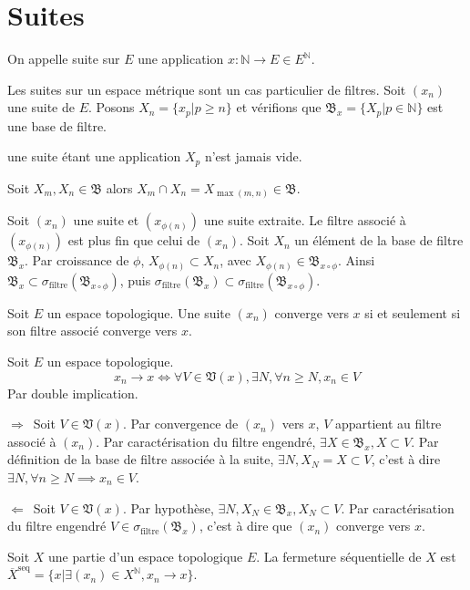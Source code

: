 \documentclass[a4paper, 11pt, french]{book}
\newenvironment{itemise}{\itemize}{\enditemize}
\theoremstyle{plain} %
\theoremstyle{definition} %
\theoremstyle{remark} %
\newcommand\impldir{$\boxed{\Rightarrow}$\ }
\newcommand\implrec{$\boxed{\Leftarrow}$\ }
\newcommand{\1}{\mathds{1}}
\newcommand{\supegal}{\geqslant}
\newcommand{\N}{\mathbb{N}}
\begin{document}
\section{Suites}

On appelle suite sur $E$ une application $x:\N\rightarrow E\in E^\N$.

\proposition
Les suites sur un espace métrique sont un cas particulier de filtres.
\demonstration
Soit $(x_n)$ une suite de $E$.
Posons $X_n=\{x_p | p\supegal n\}$ et vérifions que $\mathfrak{B}_x=\{X_p | p\in\N\}$ est une base de filtre.
\begin{itemise}
	\item une suite étant une application $X_p$ n'est jamais vide.
	\item Soit $X_m, X_n\in\mathfrak{B}$ alors $X_m\cap X_n=X_{\max(m, n)}\in\mathfrak{B}$.
\end{itemise}

\proposition
Soit $(x_n)$ une suite et $(x_{\phi(n)})$ une suite extraite.
Le filtre associé à $(x_{\phi(n)})$ est plus fin que celui de $(x_n)$.
\demonstration
Soit $X_n$ un élément de la base de filtre $\mathfrak{B}_x$.
Par croissance de $\phi$, $X_{\phi(n)}\subset X_n$, avec $X_{\phi(n)}\in\mathfrak{B}_{x\circ\phi}$.
Ainsi $\mathfrak{B}_x\subset\sigma_\text{filtre}(\mathfrak{B}_{x\circ\phi})$, puis $\sigma_\text{filtre}(\mathfrak{B}_x)\subset\sigma_\text{filtre}(\mathfrak{B}_{x\circ\phi})$.

Soit $E$ un espace topologique.
Une suite $(x_n)$ converge vers $x$ si et seulement si son filtre associé converge vers $x$.

\proposition
Soit $E$ un espace topologique.
$$
x_n\rightarrow x
\iff
\forall V\in\mathfrak{V}(x), \exists N, \forall n\supegal N, x_n\in V
$$
\demonstration Par double implication.

\impldir Soit $V\in\mathfrak{V}(x)$.
Par convergence de $(x_n)$ vers $x$, $V$ appartient au filtre associé à $(x_n)$.
Par caractérisation du filtre engendré, $\exists X\in\mathfrak{B}_x, X\subset V$.
Par définition de la base de filtre associée à la suite, $\exists N, X_N=X\subset V$, c'est à dire $\exists N, \forall n\supegal N\implies x_n\in V$.

\implrec Soit $V\in\mathfrak{V}(x)$.
Par hypothèse, $\exists N, X_N\in\mathfrak{B}_x, X_N\subset V$.
Par caractérisation du filtre engendré $V\in\sigma_\text{filtre}(\mathfrak{B}_x)$, c'est à dire que $(x_n)$ converge vers $x$.

Soit $X$ une partie d'un espace topologique $E$.
La fermeture séquentielle de $X$ est $\overline{X}^\text{seq}=\{x | \exists(x_n)\in X^\N, x_n\rightarrow x\}$.
\end{document}
